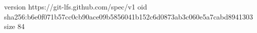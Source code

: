 version https://git-lfs.github.com/spec/v1
oid sha256:b6e0f071b57cc0cb90ace09b5856041b152c6d0873ab3c060e5a7cabd8941303
size 84
